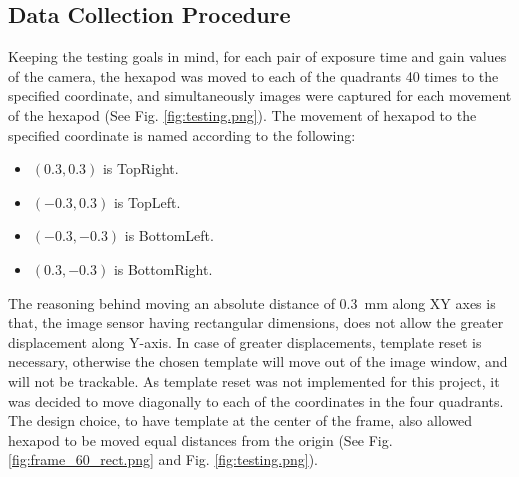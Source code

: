 \subsection*{Data Collection Procedure}\label{subsection:data_collection_procedure}
Keeping the testing goals in mind, for each pair of exposure time and gain values of the camera, the hexapod was moved to each of the quadrants 40 times to the specified coordinate, and simultaneously images were captured for each movement of the hexapod (See Fig. \ref{fig:testing.png}). The movement of hexapod to the specified coordinate is named according to the following:

\begin{itemize}
    \item $(0.3, 0.3)$ is \textsf{TopRight}.
    \item $(-0.3, 0.3)$ is \textsf{TopLeft}.
    \item $(-0.3, -0.3)$ is \textsf{BottomLeft}.
    \item $(0.3, -0.3)$ is \textsf{BottomRight}.
\end{itemize}

\noindent The reasoning behind moving an absolute distance of \SI{0.3}{\milli\meter} along XY axes is that, the image sensor having rectangular dimensions, does not allow the greater displacement along Y-axis. In case of greater displacements, template reset is necessary, otherwise the chosen template will move out of the image window, and will not be trackable. As template reset was not implemented for this project, it was decided to move diagonally to each of the coordinates in the four quadrants. The design choice, to have template at the center of the frame, also allowed hexapod to be moved equal distances from the origin (See Fig. \ref{fig:frame_60_rect.png} and Fig. \ref{fig:testing.png}).